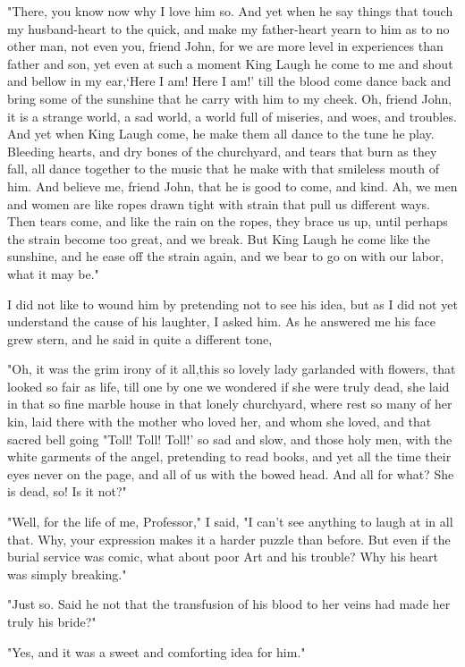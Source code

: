 "There, you know now why I love him so. And yet when he say things that touch my husband-heart to the quick, and make my father-heart yearn to him as to no other man, not even you, friend John, for we are more level in experiences than father and son, yet even at such a moment King Laugh he come to me and shout and bellow in my ear,`Here I am! Here I am!' till the blood come dance back and bring some of the sunshine that he carry with him to my cheek. Oh, friend John, it is a strange world, a sad world, a world full of miseries, and woes, and troubles. And yet when King Laugh come, he make them all dance to the tune he play. Bleeding hearts, and dry bones of the churchyard, and tears that burn as they fall, all dance together to the music that he make with that smileless mouth of him. And believe me, friend John, that he is good to come, and kind. Ah, we men and women are like ropes drawn tight with strain that pull us different ways. Then tears come, and like the rain on the ropes, they brace us up, until perhaps the strain become too great, and we break. But King Laugh he come like the sunshine, and he ease off the strain again, and we bear to go on with our labor, what it may be." 

I did not like to wound him by pretending not to see his idea, but as I did not yet understand the cause of his laughter, I asked him. As he answered me his face grew stern, and he said in quite a different tone, 

"Oh, it was the grim irony of it all,this so lovely lady garlanded with flowers, that looked so fair as life, till one by one we wondered if she were truly dead, she laid in that so fine marble house in that lonely churchyard, where rest so many of her kin, laid there with the mother who loved her, and whom she loved, and that sacred bell going "Toll! Toll! Toll!' so sad and slow, and those holy men, with the white garments of the angel, pretending to read books, and yet all the time their eyes never on the page, and all of us with the bowed head. And all for what? She is dead, so! Is it not?" 

"Well, for the life of me, Professor," I said, "I can't see anything to laugh at in all that. Why, your expression makes it a harder puzzle than before. But even if the burial service was comic, what about poor Art and his trouble? Why his heart was simply breaking." 

"Just so. Said he not that the transfusion of his blood to her veins had made her truly his bride?" 

"Yes, and it was a sweet and comforting idea for him." 

